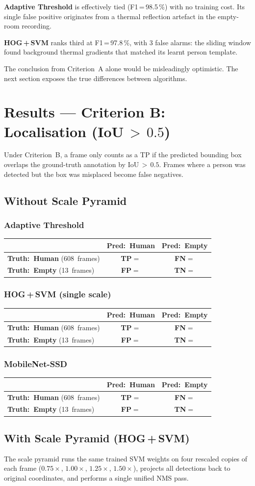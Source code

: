 \documentclass[11pt, a4paper]{article}
\newcommand{\confmat}[6]{%
    \def\cmTP{#1}\def\cmFN{#2}\def\cmFP{#3}\def\cmTN{#4}%
    \def\cmPos{#5}\def\cmNeg{#6}%
    \vspace{4pt}
    \begin{center}
    \renewcommand{\arraystretch}{1.8}%
    \begin{tabular}{lcc}
        \hline
        \rule{0pt}{2.4ex}%
        & \textbf{Pred:\ Human} & \textbf{Pred:\ Empty} \\[2pt]
        \hline
        \rule{0pt}{2.6ex}%
        \textbf{Truth:\ Human} (\cmPos\ frames)
            & \cellcolor{cellgreenlight}\textcolor{tpgreen}{\textbf{TP}}\;$=$\;\cmTP
            & \cellcolor{cellyellowlight}\textcolor{fnyellow}{\textbf{FN}}\;$=$\;\cmFN \\[4pt]
        \textbf{Truth:\ Empty} (\cmNeg\ frames)
            & \cellcolor{cellredlight}\textcolor{fpred}{\textbf{FP}}\;$=$\;\cmFP
            & \cellcolor{cellbluelight}\textcolor{tnblue}{\textbf{TN}}\;$=$\;\cmTN \\[2pt]
        \hline
    \end{tabular}
    \end{center}
    \vspace{4pt}
}
\begin{document}
\textbf{Adaptive Threshold} is effectively tied (F1\,=\,98.5\,\%) with no training cost.
Its single false positive originates from a thermal reflection artefact in the empty-room
recording.

\textbf{HOG\,+\,SVM} ranks third at F1\,=\,97.8\,\%, with 3 false alarms: the sliding
window found background thermal gradients that matched its learnt person template.

The conclusion from Criterion~A alone would be misleadingly optimistic.  The next section
exposes the true differences between algorithms.

\section{Results — Criterion B: Localisation (IoU\,$>\,0.5$)}

Under Criterion~B, a frame only counts as a TP if the predicted bounding box overlaps the
ground-truth annotation by IoU\,$>\,0.5$.  Frames where a person was detected but the box
was misplaced become false negatives.

\subsection{Without Scale Pyramid}

\subsubsection*{Adaptive Threshold}
\confmat{423}{185}{1}{12}{608}{13}

\subsubsection*{HOG\,+\,SVM (single scale)}
\confmat{246}{362}{3}{10}{608}{13}

\subsubsection*{MobileNet-SSD}
\confmat{549}{59}{0}{13}{608}{13}

\subsection{With Scale Pyramid (HOG\,+\,SVM)}

The scale pyramid runs the same trained SVM weights on four rescaled copies of each frame
($0.75\times$, $1.00\times$, $1.25\times$, $1.50\times$), projects all detections back
to original coordinates, and performs a single unified NMS pass.
\end{document}
